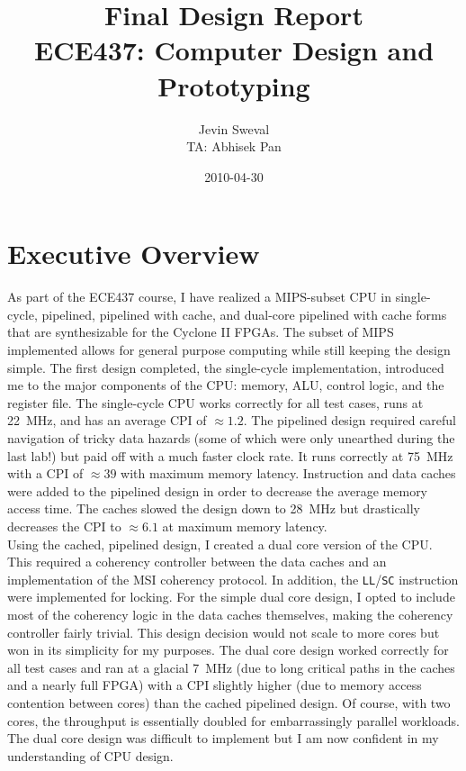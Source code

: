 \documentclass[12pt]{article}
\title{Final Design Report \\
ECE437: Computer Design and Prototyping}
\author{Jevin Sweval \\
        TA: Abhisek Pan}
\date{2010-04-30}
\begin{document}
  \maketitle
  \newpage

\section{Executive Overview}
As part of the ECE437 course, I have realized a MIPS-subset CPU in single-cycle, pipelined, pipelined with cache, and dual-core pipelined with cache forms that are synthesizable for the Cyclone II FPGAs. The subset of MIPS implemented allows for general purpose computing while still keeping the design simple. The first design completed, the single-cycle implementation, introduced me to the major components of the CPU: memory, ALU, control logic, and the register file. The single-cycle CPU works correctly for all test cases, runs at 22~MHz, and has an average CPI of $\approx 1.2$. The pipelined design required careful navigation of tricky data hazards (some of which were only unearthed during the last lab!) but paid off with a much faster clock rate. It runs correctly at 75~MHz with a CPI of $\approx 39$ with maximum memory latency. Instruction and data caches were added to the pipelined design in order to decrease the average memory access time. The caches slowed the design down to 28~MHz but drastically decreases the CPI to $\approx 6.1$ at maximum memory latency.\\

Using the cached, pipelined design, I created a dual core version of the CPU. This required a coherency controller between the data caches and an implementation of the MSI coherency protocol. In addition, the \texttt{LL}/\texttt{SC} instruction were implemented for locking. For the simple dual core design, I opted to include most of the coherency logic in the data caches themselves, making the coherency controller fairly trivial. This design decision would not scale to more cores but won in its simplicity for my purposes. The dual core design worked correctly for all test cases and ran at a glacial 7~MHz (due to long critical paths in the caches and a nearly full FPGA) with a CPI slightly higher (due to memory access contention between cores) than the cached pipelined design. Of course, with two cores, the throughput is essentially doubled for embarrassingly parallel workloads. The dual core design was difficult to implement but I am now confident in my understanding of CPU design.\\
\end{document}
